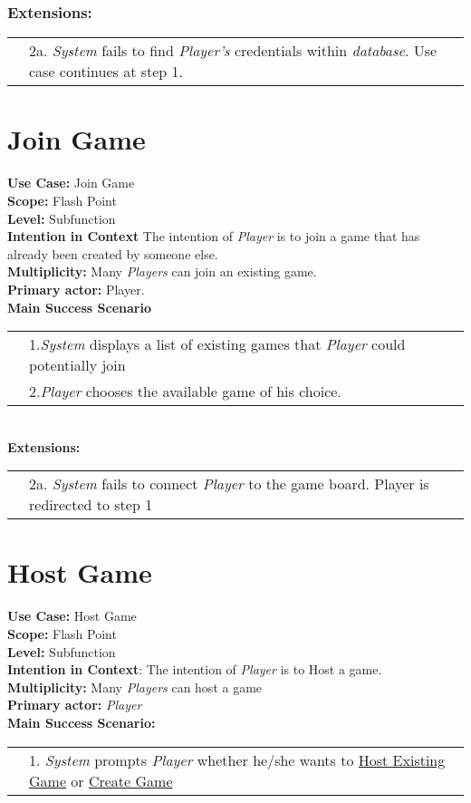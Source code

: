 \documentclass{article}
\begin{document}
	\subsubsection*{Extensions:}
	\begin{tabular}{l l}
		&2a. \textit{System} fails to find \textit{Player's} credentials within \textit{database}. Use case continues at step 1.
	\end{tabular}
	\section*{Join Game}
	\textbf{Use Case:} Join Game\\
	\textbf{Scope:}
	Flash Point\\
	\textbf{Level:}
	Subfunction\\
	\textbf{Intention in Context}
	The intention of \textit{Player} is to join a game that has already been created by someone else.\\
	\textbf{Multiplicity:}
	Many \textit{Players} can join an existing game.\\
	\textbf{Primary actor: }
	Player.\\
	\textbf{Main Success Scenario}\\
	\begin{tabular}{l l}
		&1.\textit{System} displays a list of existing games that \textit{Player} could potentially join\\
		&2.\textit{Player} chooses the available game of his choice.
	\end{tabular}\\
	\textbf{Extensions:}\\
	\begin{tabular}{l l}
		&2a. \textit{System} fails to connect \textit{Player} to the game board. Player is redirected to step 1\\
	\end{tabular}
	
	\section*{Host Game}
	\textbf{Use Case:}  Host Game\\
	\textbf{Scope:} Flash Point\\
	\textbf{Level:} Subfunction\\
	\textbf{Intention in Context}: 
	The intention of \textit{Player} is to Host a game.\\
	\textbf{Multiplicity:} Many \textit{Players} can host a game\\
	\textbf{Primary actor:} \textit{Player}\\
	\textbf{Main Success Scenario:}\\
	\begin{tabular}{l l}
		&1. \textit{System} prompts \textit{Player} whether he/she wants to \underline{Host Existing Game} or \underline{Create Game}\\
	\end{tabular}
\end{document}
